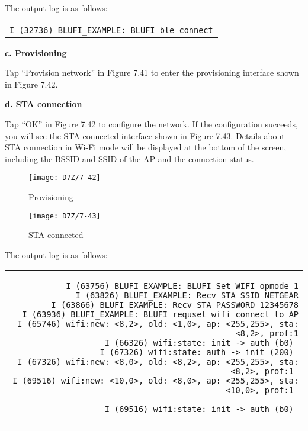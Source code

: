 \documentclass[a4paper,12pt]{book}
\begin{document}
The output log is as follows:

\begin{codebloc}
\begin{tabular}{d}
\verb|I (32736) BLUFI_EXAMPLE: BLUFI ble connect|
\end{tabular}
\end{codebloc}

\textbf{c. Provisioning}

Tap “Provision network” in Figure 7.41 to enter the provisioning interface shown in Figure 7.42.

\textbf{d. STA connection}

Tap “OK” in Figure 7.42 to configure the network. If the configuration succeeds, you will see the STA connected interface shown in Figure 7.43. Details about STA connection in Wi-Fi mode will be displayed at the bottom of the screen, including the BSSID and SSID of the AP and the connection status.

\begin{figure}[!h]
  \Centering
  \begin{minipage}[b]{0.4\textwidth}
    \texttt{[image: D7Z/7-42]}
    \caption{Provisioning}
  \end{minipage}\hspace{2em}
  \begin{minipage}[b]{0.4\textwidth}
    \texttt{[image: D7Z/7-43]}
    \caption{STA connected}
  \end{minipage}
\end{figure}

The output log is as follows:

\begin{codebloc}
\fontsize{9.9pt}{9.9pt}\selectfont
\begin{tabular}{d}
\vspace{2pt}
\begin{verbatim}
I (63756) BLUFI_EXAMPLE: BLUFI Set WIFI opmode 1
I (63826) BLUFI_EXAMPLE: Recv STA SSID NETGEAR
I (63866) BLUFI_EXAMPLE: Recv STA PASSWORD 12345678
I (63936) BLUFI_EXAMPLE: BLUFI requset wifi connect to AP
I (65746) wifi:new: <8,2>, old: <1,0>, ap: <255,255>, sta: <8,2>, prof:1
I (66326) wifi:state: init -> auth (b0) 
I (67326) wifi:state: auth -> init (200) 
I (67326) wifi:new: <8,0>, old: <8,2>, ap: <255,255>, sta: <8,2>, prof:1 
I (69516) wifi:new: <10,0>, old: <8,0>, ap: <255,255>, sta: <10,0>, prof:1 
\end{verbatim} 
\verb|I (69516) wifi:state: init -> auth (b0) |
\end{tabular}
\end{codebloc}
\end{document}

